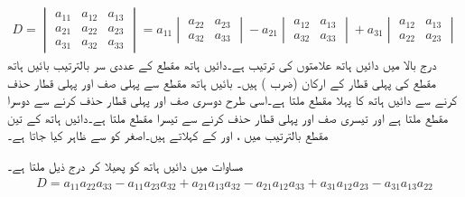 \begin{align}\label{مساوات_الجبرا_تین_درجی_مقطع_الف}
D=
\begin{vmatrix}
a_{11}&a_{12}&a_{13}\\
a_{21}&a_{22}&a_{23}\\
a_{31}&a_{32}&a_{33}
\end{vmatrix}
=a_{11}
\begin{vmatrix}
a_{22}&a_{23}\\
a_{32}&a_{33}
\end{vmatrix}
-a_{21}
\begin{vmatrix}
a_{12}&a_{13}\\
a_{32}&a_{33}
\end{vmatrix}
+a_{31}
\begin{vmatrix}
a_{12}&a_{13}\\
a_{22}&a_{23}
\end{vmatrix}
\end{align}
درج بالا میں دائیں ہاتھ علامتوں کی ترتیب  ہے۔دائیں ہاتھ مقطع کے عددی سر بالترتیب بائیں ہاتھ مقطع کی پہلی قطار کے ارکان (ضرب ) ہیں۔ بائیں ہاتھ مقطع سے پہلی صف اور پہلی قطار حذف کرنے سے دائیں ہاتھ کا پہلا مقطع ملتا ہے۔اسی طرح دوسری صف اور پہلی قطار حذف کرنے سے دوسرا مقطع ملتا ہے اور تیسری صف اور پہلی قطار حذف کرنے سے تیسرا مقطع ملتا ہے۔دائیں ہاتھ کے تین مقطع بالترتیب  میں ،  اور  کے  کہلاتے ہیں۔اصغر کو  سے ظاہر کیا جاتا ہے۔

مساوات  میں دائیں ہاتھ  کو پھیلا کر درج ذیل ملتا ہے۔
\begin{align}\label{مساوات_الجبرا_تین_درجی_مقطع_ب}
D=a_{11}a_{22}a_{33}-a_{11}a_{23}a_{32}+a_{21}a_{13}a_{32}-a_{21}a_{12}a_{33}+a_{31}a_{12}a_{23}-a_{31}a_{13}a_{22}
\end{align}

